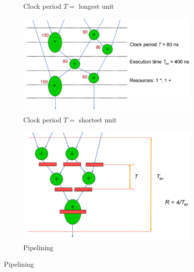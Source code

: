 \begin{figure}[h]
\begin{center}
\begin{subfigure}[b]{0.45\textwidth}
			\caption{Clock period $T=$ longest unit}
		\end{subfigure}
		\begin{subfigure}[b]{0.45\textwidth}
			\includegraphics[width=\textwidth]{images/Performance_3.png}	
			\caption{Clock period $T=$ shortest unit}
		\end{subfigure}
		\hfill
		\begin{subfigure}[b]{0.4\textwidth}
			\includegraphics[width=\textwidth]{images/Performance_4.png}	
			\caption{Pipelining}
		\end{subfigure}
	\end{center}
\end{figure}

